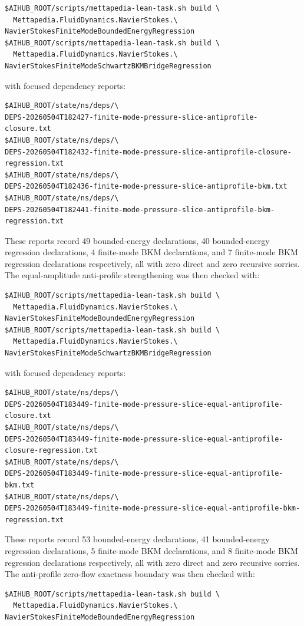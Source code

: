 \documentclass[11pt]{article}
\begin{document}
\begin{verbatim}
$AIHUB_ROOT/scripts/mettapedia-lean-task.sh build \
  Mettapedia.FluidDynamics.NavierStokes.\
NavierStokesFiniteModeBoundedEnergyRegression
$AIHUB_ROOT/scripts/mettapedia-lean-task.sh build \
  Mettapedia.FluidDynamics.NavierStokes.\
NavierStokesFiniteModeSchwartzBKMBridgeRegression
\end{verbatim}
with focused dependency reports:
\begin{verbatim}
$AIHUB_ROOT/state/ns/deps/\
DEPS-20260504T182427-finite-mode-pressure-slice-antiprofile-closure.txt
$AIHUB_ROOT/state/ns/deps/\
DEPS-20260504T182432-finite-mode-pressure-slice-antiprofile-closure-regression.txt
$AIHUB_ROOT/state/ns/deps/\
DEPS-20260504T182436-finite-mode-pressure-slice-antiprofile-bkm.txt
$AIHUB_ROOT/state/ns/deps/\
DEPS-20260504T182441-finite-mode-pressure-slice-antiprofile-bkm-regression.txt
\end{verbatim}
These reports record 49 bounded-energy declarations, 40 bounded-energy
regression declarations, 4 finite-mode BKM declarations, and 7 finite-mode BKM
regression declarations respectively, all with zero direct and zero recursive
sorries.
The equal-amplitude anti-profile strengthening was then checked with:
\begin{verbatim}
$AIHUB_ROOT/scripts/mettapedia-lean-task.sh build \
  Mettapedia.FluidDynamics.NavierStokes.\
NavierStokesFiniteModeBoundedEnergyRegression
$AIHUB_ROOT/scripts/mettapedia-lean-task.sh build \
  Mettapedia.FluidDynamics.NavierStokes.\
NavierStokesFiniteModeSchwartzBKMBridgeRegression
\end{verbatim}
with focused dependency reports:
\begin{verbatim}
$AIHUB_ROOT/state/ns/deps/\
DEPS-20260504T183449-finite-mode-pressure-slice-equal-antiprofile-closure.txt
$AIHUB_ROOT/state/ns/deps/\
DEPS-20260504T183449-finite-mode-pressure-slice-equal-antiprofile-closure-regression.txt
$AIHUB_ROOT/state/ns/deps/\
DEPS-20260504T183449-finite-mode-pressure-slice-equal-antiprofile-bkm.txt
$AIHUB_ROOT/state/ns/deps/\
DEPS-20260504T183449-finite-mode-pressure-slice-equal-antiprofile-bkm-regression.txt
\end{verbatim}
These reports record 53 bounded-energy declarations, 41 bounded-energy
regression declarations, 5 finite-mode BKM declarations, and 8 finite-mode BKM
regression declarations respectively, all with zero direct and zero recursive
sorries.
The anti-profile zero-flow exactness boundary was then checked with:
\begin{verbatim}
$AIHUB_ROOT/scripts/mettapedia-lean-task.sh build \
  Mettapedia.FluidDynamics.NavierStokes.\
NavierStokesFiniteModeBoundedEnergyRegression
\end{verbatim}
\end{document}
